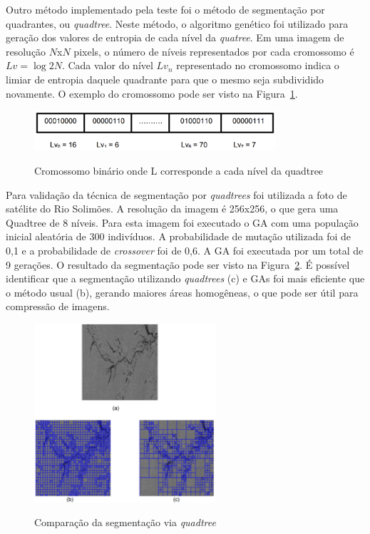 \documentclass[12pt,oneside,a4paper,english,french,spanish,brazil,]{abntex2}
\begin{document}
Outro método implementado pela teste foi o método de segmentação por quadrantes, ou \textit{quadtree}. Neste método, o algoritmo genético foi utilizado para geração dos valores de entropia de cada nível da \textit{quatree}. Em uma imagem de resolução \(N\)x\(N\) pixels, o número de níveis representados por cada cromossomo é \(Lv=\log 2 N\). Cada valor do nível \(Lv_n\) representado no cromossomo indica o limiar de entropia daquele quadrante para que o mesmo seja subdividido novamente. O exemplo do cromossomo pode ser visto na Figura~\ref{fig:TrCo_Matias_Cromossomo_1}.

\begin{figure}[ht]
\centering
\caption{Cromossomo binário onde L corresponde a cada nível da quadtree}
\includegraphics[width=0.8\textwidth]{imagens/TrCo_Matias_Cromossomo_1.PNG}
\label{fig:TrCo_Matias_Cromossomo_1}
\end{figure}

Para validação da técnica de segmentação por \textit{quadtrees} foi utilizada a foto de satélite do Rio Solimões. A resolução da imagem é 256x256, o que gera uma Quadtree de 8 níveis. Para esta imagem foi executado o GA com uma população inicial aleatória de 300 indivíduos. A probabilidade de mutação utilizada foi de 0,1 e a probabilidade de \textit{crossover} foi de 0,6. A GA foi executada por um total de 9 gerações. O resultado da segmentação pode ser visto na Figura~\ref{fig:TrCo_Matias_Quadtree_1}. É possível identificar que a segmentação utilizando \textit{quadtrees} (c) e GAs foi mais eficiente que o método usual (b), gerando maiores áreas homogêneas, o que pode ser útil para compressão de imagens.

\begin{figure}[ht]
\centering
\caption{Comparação da segmentação via \textit{quadtree}}
\includegraphics[width=0.6\textwidth]{imagens/TrCo_Matias_Quadtree_1.PNG}
\label{fig:TrCo_Matias_Quadtree_1}
\end{figure}
\end{document}
